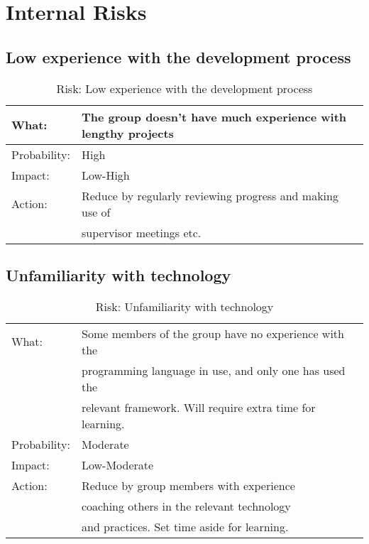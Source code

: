 
\section{Internal Risks} \label{internalRisks}
\subsection{Low experience with the development process}
\begin{table}[H]
\begin{tabular}{| l | l |}
	\hline
	What: & The group doesn't have much experience with lengthy projects\\
	\hline
	Probability: & High \\
	\hline
	Impact: & Low-High \\
	\hline
	Action: & Reduce by regularly reviewing progress and making use of \\
			& supervisor meetings etc.\\
	\hline
\end{tabular}
\caption{Risk: Low experience with the development process}
\end{table}

\subsection{Unfamiliarity with technology}
\begin{table}[H]
\begin{tabular}{| l | l |}
	\hline
	What: & Some members of the group have no experience with the \\
		& programming language in use, and only one has used the \\
		& relevant framework. Will require extra time for learning.\\
	\hline
	Probability: & Moderate \\
	\hline
	Impact: & Low-Moderate \\
	\hline
	Action: & Reduce by group members with experience \\
	& coaching others in the relevant technology\\
	& and practices. Set time aside for learning.\\
	\hline
\end{tabular}
\caption{Risk: Unfamiliarity with technology}
\end{table}

